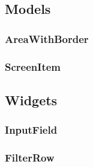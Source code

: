 \subsection{Models}

\subsubsection{AreaWithBorder}

\subsubsection{ScreenItem}

\subsection{Widgets}

\subsubsection{InputField}
\label{fig:InputField} 


\subsubsection{FilterRow}
\label{fig:FilterRow}